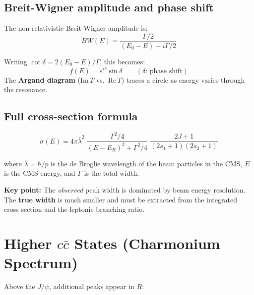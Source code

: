 \documentclass[11pt,a4paper]{article}
\newenvironment{notebox}{%
  \par\vspace{4pt}
  \noindent\small\color{notegray}%
}{\par\vspace{4pt}}
\newcommand{\important}[1]{{\color{alertred}\textbf{#1}}}
\newcommand{\keyword}[1]{\textbf{#1}}
\begin{document}
\subsection{Breit-Wigner amplitude and phase shift}

The non-relativistic Breit-Wigner amplitude is:
\[
  BW(E) = \frac{\Gamma/2}{(E_0 - E) - i\Gamma/2}
\]

Writing $\cot\delta = 2(E_0 - E)/\Gamma$, this becomes:
\[
  f(E) = e^{i\delta}\sin\delta \qquad (\delta\text{: phase shift})
\]
The \keyword{Argand diagram} ($\mathrm{Im}\,T$ vs.\ $\mathrm{Re}\,T$) traces a circle as
energy varies through the resonance.

\subsection{Full cross-section formula}

\[
  \sigma(E) = 4\pi\bar{\lambda}^2
  \;\frac{\Gamma^2/4}{\left(E - E_R\right)^2 + \Gamma^2/4}
  \;\frac{2J+1}{(2s_1+1)(2s_2+1)}
\]

where $\bar{\lambda} = \hbar/p$ is the de Broglie wavelength of the beam particles in
the CMS, $E$ is the CMS energy, and $\Gamma$ is the total width.

\begin{notebox}
  \important{Key point:} The \emph{observed} peak width is dominated by beam energy
  resolution. The \textbf{true width} is much smaller and must be extracted from the
  integrated cross section and the leptonic branching ratio.
\end{notebox}

\section{Higher \texorpdfstring{$c\bar{c}$}{ccbar} States (Charmonium Spectrum)}

Above the $J/\psi$, additional peaks appear in $R$:
\end{document}
